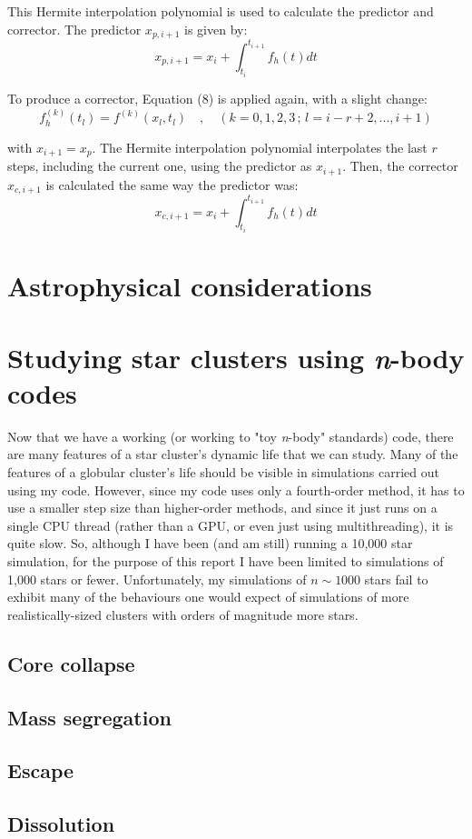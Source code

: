 \documentclass{article}
\begin{document}
This Hermite interpolation polynomial is used to calculate the predictor and corrector. The predictor $x_{p,i+1}$ is given by:
\begin{equation}
x_{p,i+1} = x_i + \int_{t_i}^{t_{i+1}} f_h(t)dt
\end{equation}

To produce a corrector, Equation (8) is applied again, with a slight change:
\begin{equation}
f^{(k)}_h(t_l) = f^{(k)}(x_l,t_l) \quad,\quad (k=0,1,2,3\,;\,l=i-r+2,...,i+1)
\end{equation}

with $x_{i+1} = x_p$. The Hermite interpolation polynomial interpolates the last $r$ steps, including the current one, using the predictor as $x_{i+1}$. Then, the corrector $x_{c,i+1}$ is calculated the same way the predictor was:
\begin{equation}
x_{c,i+1} = x_i + \int_{t_i}^{t_{i+1}} f_h(t)dt
\end{equation}

\section{Astrophysical considerations}

\section{Studying star clusters using \textit{n}-body codes}

Now that we have a working (or working to "toy \textit{n}-body" standards) code,  there are many features of a star cluster's dynamic life that we can study. Many of the features of a globular cluster's life should be visible in simulations carried out using my code. However, since my code uses only a fourth-order method, it has to use a smaller step size than higher-order methods, and since it just runs on a single CPU thread (rather than a GPU, or even just using multithreading), it is quite slow. So, although I have been (and am still) running a 10,000 star simulation, for the purpose of this report I have been limited to simulations of 1,000 stars or fewer. Unfortunately, my simulations of $n \sim 1000$ stars fail to exhibit many of the behaviours one would expect of simulations of more realistically-sized clusters with orders of magnitude more stars.

\subsection{Core collapse}

\subsection{Mass segregation}

\subsection{Escape}

\subsection{Dissolution}






\end{document}
